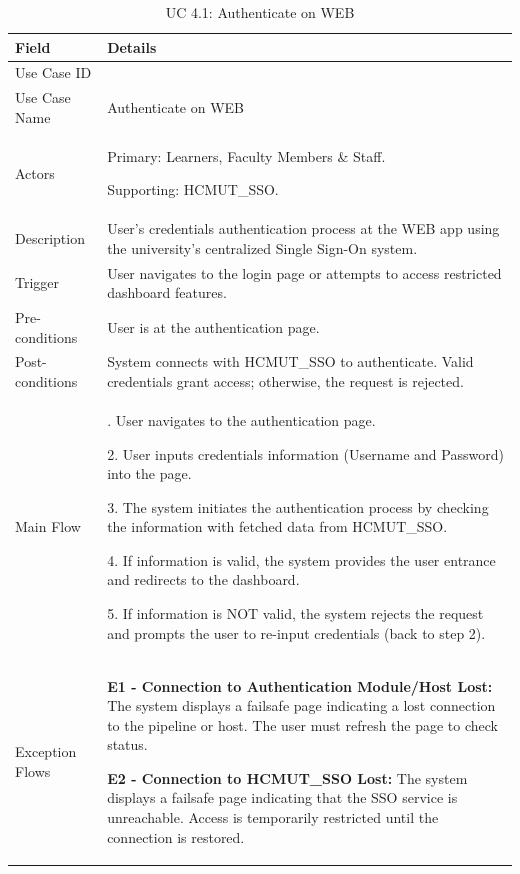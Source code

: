 \begin{table}[H]
\small
\renewcommand{\arraystretch}{1.4}
\begin{tabularx}{\textwidth}{|>{\raggedright\arraybackslash}p{3.5cm}|>{\RaggedRight\arraybackslash}X|}
\hline
\rowcolor{gray!20} \textbf{Field} & \textbf{Details} \\
\hline
Use Case ID & 4.1 \\
\hline
Use Case Name & Authenticate on WEB \\
\hline
Actors & Primary: Learners, Faculty Members \& Staff. \par Supporting: HCMUT\_SSO. \\
\hline
Description & User’s credentials authentication process at the WEB app using the university's centralized Single Sign-On system. \\
\hline
Trigger & User navigates to the login page or attempts to access restricted dashboard features. \\
\hline
Pre-conditions & User is at the authentication page. \\
\hline
Post-conditions & System connects with HCMUT\_SSO to authenticate. Valid credentials grant access; otherwise, the request is rejected. \\
\hline
Main Flow & 
1. User navigates to the authentication page. \par
2. User inputs credentials information (Username and Password) into the page. \par
3. The system initiates the authentication process by checking the information with fetched data from HCMUT\_SSO. \par
4. If information is valid, the system provides the user entrance and redirects to the dashboard. \par
5. If information is NOT valid, the system rejects the request and prompts the user to re-input credentials (back to step 2). \\
\hline
Exception Flows & 
\textbf{E1 - Connection to Authentication Module/Host Lost:} The system displays a failsafe page indicating a lost connection to the pipeline or host. The user must refresh the page to check status. \par \vspace{0.5em}
\textbf{E2 - Connection to HCMUT\_SSO Lost:} The system displays a failsafe page indicating that the SSO service is unreachable. Access is temporarily restricted until the connection is restored. \\
\hline
\end{tabularx}
\caption{UC 4.1: Authenticate on WEB}
\label{tab:uc4.1}
\end{table}